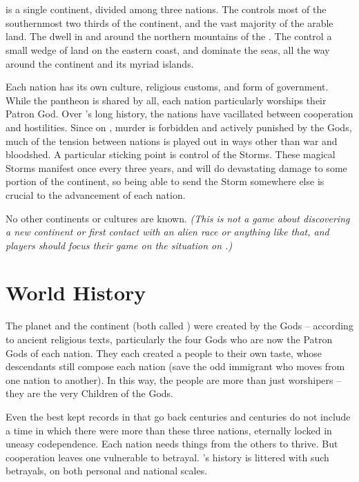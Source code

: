\documentclass[blue]{GL2020}
\begin{document}
\name{\bWorld{}}

\section*{\pEarth{}}
\pEarth{} is a single continent, divided among three nations. The \pFarm{} controls most of the southernmost two thirds of the continent, and the vast majority of the arable land. The \pTech{} dwell in and around the northern mountains of the \pSpine{}. The \pShip{} control a small wedge of land on the eastern coast, and dominate the seas, all the way around the continent and its myriad islands.

Each nation has its own culture, religious customs, and form of government. While the pantheon is shared by all, each nation particularly worships their Patron God. Over \pEarth{}'s long history, the nations have vacillated between cooperation and hostilities. Since on \pEarth{}, murder is forbidden and actively punished by the Gods, much of the tension between nations is played out in ways other than war and bloodshed. A particular sticking point is control of the Storms. These magical Storms manifest once every three years, and will do devastating damage to some portion of the continent, so being able to send the Storm somewhere else is crucial to the advancement of each nation.

No other continents or cultures are known. \emph{(This is not a game about discovering a new continent or first contact with an alien race or anything like that, and players should focus their game on the situation on \pEarth{}.)}

\section*{World History}
The planet and the continent (both called \pEarth{}) were created by the Gods -- according to ancient religious texts, particularly the four Gods who are now the Patron Gods of each nation. They each created a people to their own taste, whose descendants still compose each nation (save the odd immigrant who moves from one nation to another). In this way, the people are more than just worshipers -- they are the very Children of the Gods.

Even the best kept records in \pEarth{} that go back centuries and centuries do not include a time in which there were more than these three nations, eternally locked in uneasy codependence. Each nation needs things from the others to thrive. But cooperation leaves one vulnerable to betrayal. \pEarth{}'s history is littered with such betrayals, on both personal and national scales.
\end{document}
